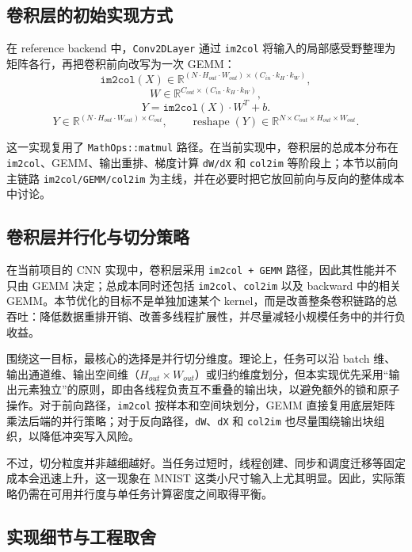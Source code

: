 \documentclass[a4paper,11pt,oneside]{article}
\begin{document}
\subsection{卷积层的初始实现方式}

在 reference backend 中，\texttt{Conv2DLayer} 通过 \texttt{im2col} 将输入的局部感受野整理为矩阵各行，再把卷积前向改写为一次 GEMM：
\[
\texttt{im2col}(X) \in \mathbb{R}^{(N \cdot H_{out} \cdot W_{out}) \times (C_{in}\cdot k_H \cdot k_W)},
\]
\[
W \in \mathbb{R}^{C_{out} \times (C_{in}\cdot k_H \cdot k_W)},
\]
\[
Y = \texttt{im2col}(X)\cdot W^T + b.
\]
\[
Y \in \mathbb{R}^{(N \cdot H_{out} \cdot W_{out}) \times C_{out}},
\qquad
\operatorname{reshape}(Y) \in \mathbb{R}^{N \times C_{out} \times H_{out} \times W_{out}}.
\]

这一实现复用了 \texttt{MathOps::matmul} 路径。在当前实现中，卷积层的总成本分布在 \texttt{im2col}、GEMM、输出重排、梯度计算 \texttt{dW/dX} 和 \texttt{col2im} 等阶段上；本节以前向主链路 \texttt{im2col/GEMM/col2im} 为主线，并在必要时把它放回前向与反向的整体成本中讨论。

\subsection{卷积层并行化与切分策略}

在当前项目的 CNN 实现中，卷积层采用 \texttt{im2col + GEMM} 路径，因此其性能并不只由 GEMM 决定；总成本同时还包括 \texttt{im2col}、\texttt{col2im} 以及 backward 中的相关 GEMM。本节优化的目标不是单独加速某个 kernel，而是改善整条卷积链路的总吞吐：降低数据重排开销、改善多线程扩展性，并尽量减轻小规模任务中的并行负收益。

围绕这一目标，最核心的选择是并行切分维度。理论上，任务可以沿 batch 维、输出通道维、输出空间维（$H_{out}\times W_{out}$）或归约维度划分，但本实现优先采用“输出元素独立”的原则，即由各线程负责互不重叠的输出块，以避免额外的锁和原子操作。对于前向路径，\texttt{im2col} 按样本和空间块划分，GEMM 直接复用底层矩阵乘法后端的并行策略；对于反向路径，\texttt{dW}、\texttt{dX} 和 \texttt{col2im} 也尽量围绕输出块组织，以降低冲突写入风险。

不过，切分粒度并非越细越好。当任务过短时，线程创建、同步和调度迁移等固定成本会迅速上升，这一现象在 MNIST 这类小尺寸输入上尤其明显。因此，实际策略仍需在可用并行度与单任务计算密度之间取得平衡。

\subsection{实现细节与工程取舍}
\end{document}
